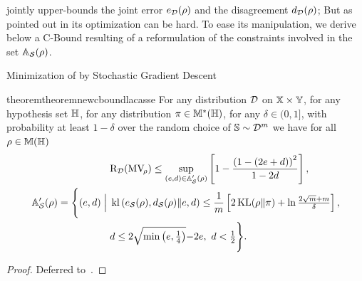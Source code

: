 \label{section:contribution-e-d}
 jointly upper-bounds the joint error $e_{\mathcal{D}}(\rho)$ and the disagreement $d_{\mathcal{D}}(\rho)$; But as pointed out in  its optimization can be hard.
To ease its manipulation, we derive below a C-Bound resulting of a reformulation of the constraints involved in the set $\mathbb{A}_{\mathcal{S}}(\rho)$.

\begin{algorithm}[H]
 \caption{Minimization of  by Stochastic Gradient Descent}
  \begin{algorithmic}
    \State{$\Q \leftarrow \P$}
        \EndFor
    \EndFor
    \State{\Return{$\Q$}}
  \end{algorithmic}
  \label{chap:mv:algo:seeger}
\end{algorithm}

\begin{restatable}{theorem}{theoremnewcboundlacasse}
For any distribution $\mathcal{D}$ on $\mathbb{X}\times\mathbb{Y}$, for any hypothesis set $\mathbb{H}$, for any distribution $\pi\in\mathbb{M}^{*}(\mathbb{H})$, for any $\delta\in(0,1]$, with probability at least $1-\delta$ over the random choice of $\mathbb{S}\sim\mathcal{D}^m$ we have for all $\rho\in\mathbb{M}(\mathbb{H})$
\begin{align}
    &\text{R}_{\mathcal{D}}(\text{MV}_{\!\rho}) \le \sup_{(e, d)\in \mathbb{A}'_{\mathcal{S}}(\rho)} \left[ 1- \frac{\left( 1-(2e+d)\right)^2}{1-2d} \right],\label{chap:mv:eq:new-cbound-lacasse}\\ 
    \mathbb{A}'_{\mathcal{S}}(\rho) = \Bigg\{ (e, d) \;\Big|\; &\operatorname{kl}\left( e_{\mathcal{S}}(\rho),  d_{\mathcal{S}}(\rho)\|e, d\right) \le \frac{1}{m}\left[ 2\operatorname{KL}(\rho\|\pi) + \ln\tfrac{2\sqrt{m}+m}{\delta}\right],\nonumber\\
&d\le 2\sqrt{\min\left( e, \tfrac{1}{4}\right)}{-}2e,\  d<\tfrac{1}{2}\Bigg\}\nonumber.
   \end{align}
\label{chap:mv:theorem:new-cbound-lacasse}
\end{restatable}
\begin{noaddcontents}\begin{proof}
Deferred to~.
\end{proof}\end{noaddcontents}

